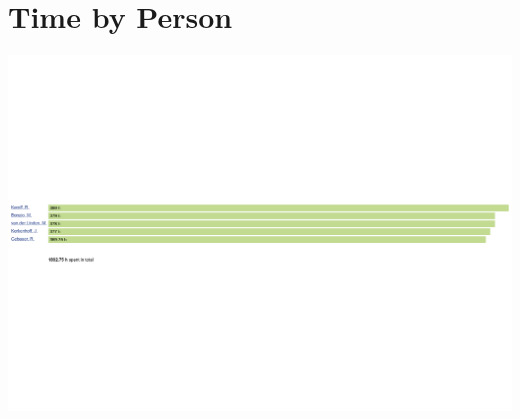 \documentclass[12pt]{article}
\begin{document}
	\section{Time by Person}
		\hspace*{0.20\paperheight}
		\includegraphics[width=1.25\textwidth,angle=90]{timebyperson}
		\clearpage

	
\end{document}

